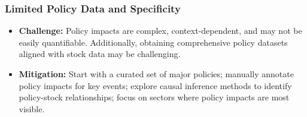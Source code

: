 \subsubsection{Limited Policy Data and Specificity}
\begin{itemize}
    \item \textbf{Challenge:} Policy impacts are complex, context-dependent, and may not be easily quantifiable. Additionally, obtaining comprehensive policy datasets aligned with stock data may be challenging.
    \item \textbf{Mitigation:} Start with a curated set of major policies; manually annotate policy impacts for key events; explore causal inference methods to identify policy-stock relationships; focus on sectors where policy impacts are most visible.
\end{itemize}